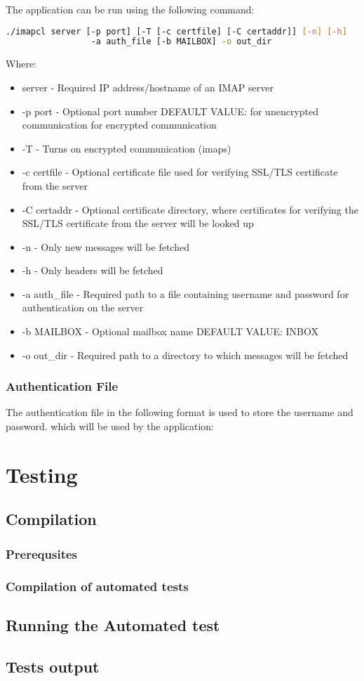 \documentclass[11pt, a4paper]{article}
\begin{document}
The application can be run using the following command:
\begin{lstlisting}[language=bash]
./imapcl server [-p port] [-T [-c certfile] [-C certaddr]] [-n] [-h]
                 -a auth_file [-b MAILBOX] -o out_dir
\end{lstlisting}
Where:
\begin{itemize}
  \item server          - Required IP address/hostname of an IMAP server
  \item -p port         - Optional port number
    \subitem DEFAULT VALUE:
     for unencrypted communication
     for encrypted communication
  \item -T              - Turns on encrypted communication (imaps)
  \item -c certfile     - Optional certificate file used for verifying SSL/TLS certificate from the server
  \item -C certaddr     - Optional certificate directory, where certificates for verifying the SSL/TLS certificate from the server will be looked up
  \item -n              - Only new messages will be fetched
  \item -h              - Only headers will be fetched
  \item -a auth\_file    - Required path to a file containing username and password for authentication on the server
  \item -b MAILBOX      - Optional mailbox name
    \subitem DEFAULT VALUE:
    \subsubitem INBOX
  \item -o out\_dir      - Required path to a directory to which messages will be fetched
\end{itemize}
\subsubsection{Authentication File}

The authentication file in the following format is used to store the username and password. which will be used by the application:

\section{Testing}
\subsection{Compilation}
\subsubsection{Prerequsites}
\subsubsection{Compilation of automated tests}
\subsection{Running the Automated test}
\subsection{Tests output}

\newpage

\renewcommand{\refname}{Bibliography}

\end{document}
